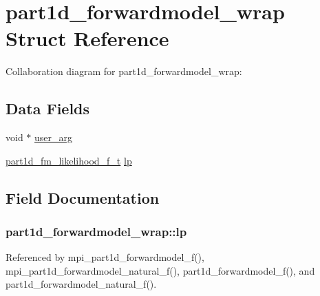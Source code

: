 \hypertarget{structpart1d__forwardmodel__wrap}{}\section{part1d\+\_\+forwardmodel\+\_\+wrap Struct Reference}
\label{structpart1d__forwardmodel__wrap}


Collaboration diagram for part1d\+\_\+forwardmodel\+\_\+wrap\+:
\subsection*{Data Fields}
\begin{DoxyCompactItemize}
\item 
void $\ast$ \hyperlink{structpart1d__forwardmodel__wrap_a06eaf072c527c4e04b24ba613738dfd7}{user\+\_\+arg}
\item 
\hyperlink{forwardmodel__f_8h_a8b789e1ff02840c9add4b43c58b5d570}{part1d\+\_\+fm\+\_\+likelihood\+\_\+f\+\_\+t} \hyperlink{structpart1d__forwardmodel__wrap_a73168dda0df93e555a6c249592c4ba87}{lp}
\end{DoxyCompactItemize}


\subsection{Field Documentation}
\subsubsection[{\texorpdfstring{lp}{lp}}]{ part1d\+\_\+forwardmodel\+\_\+wrap\+::lp}\hypertarget{structpart1d__forwardmodel__wrap_a73168dda0df93e555a6c249592c4ba87}{}\label{structpart1d__forwardmodel__wrap_a73168dda0df93e555a6c249592c4ba87}


Referenced by mpi\+\_\+part1d\+\_\+forwardmodel\+\_\+f(), mpi\+\_\+part1d\+\_\+forwardmodel\+\_\+natural\+\_\+f(), part1d\+\_\+forwardmodel\+\_\+f(), and part1d\+\_\+forwardmodel\+\_\+natural\+\_\+f().

